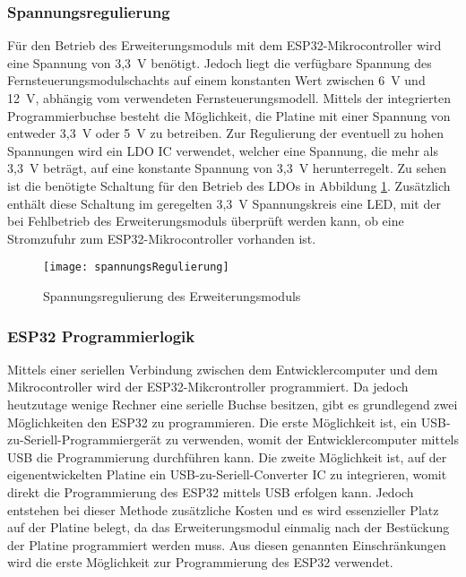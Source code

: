 \subsubsection{Spannungsregulierung}
Für den Betrieb des Erweiterungsmoduls mit dem ESP32-Mikrocontroller wird eine Spannung von 3,3~V benötigt. Jedoch liegt die verfügbare Spannung des Fernsteuerungsmodulschachts auf einem konstanten Wert zwischen 6~V und 12~V, abhängig vom verwendeten Fernsteuerungsmodell. Mittels der integrierten Programmierbuchse besteht die Möglichkeit, die Platine mit einer Spannung von entweder 3,3~V oder 5~V zu betreiben. Zur Regulierung der eventuell zu hohen Spannungen wird ein \ac{LDO} \ac{IC} verwendet, welcher eine Spannung, die mehr als 3,3~V beträgt, auf eine konstante Spannung von 3,3~V herunterregelt. Zu sehen ist die benötigte Schaltung für den Betrieb des \acp{LDO} in Abbildung \ref{fig:spannungsRegulierung}. Zusätzlich enthält diese Schaltung im geregelten 3,3~V Spannungskreis eine \acs{LED}, mit der bei Fehlbetrieb des Erweiterungsmoduls überprüft werden kann, ob eine Stromzufuhr zum ESP32-Mikrocontroller vorhanden ist.

\begin{figure}[h]
    \centering
    \texttt{[image: spannungsRegulierung]}
    \caption{Spannungsregulierung des Erweiterungsmoduls}
    \label{fig:spannungsRegulierung}
\end{figure}

\subsubsection{ESP32 Programmierlogik}
Mittels einer seriellen Verbindung zwischen dem Entwicklercomputer und dem Mikrocontroller wird der ESP32-Mikcrontroller programmiert. Da jedoch heutzutage wenige Rechner eine serielle Buchse besitzen, gibt es grundlegend zwei Möglichkeiten den ESP32 zu programmieren. Die erste Möglichkeit ist, ein \acs{USB}-zu-Seriell-Programmiergerät zu verwenden, womit der Entwicklercomputer mittels \acs{USB} die Programmierung durchführen kann. Die zweite Möglichkeit ist, auf der eigenentwickelten Platine ein \acs{USB}-zu-Seriell-Converter \ac{IC} zu integrieren, womit direkt die Programmierung des ESP32 mittels \acs{USB} erfolgen kann. Jedoch entstehen bei dieser Methode zusätzliche Kosten und es wird essenzieller Platz auf der Platine belegt, da das Erweiterungsmodul einmalig nach der Bestückung der Platine programmiert werden muss. Aus diesen genannten Einschränkungen wird die erste Möglichkeit zur Programmierung des ESP32 verwendet.

